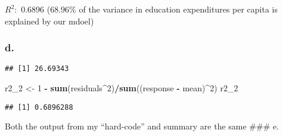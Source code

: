 \documentclass[
]{article}
\newenvironment{Shaded}{\begin{snugshade}}{\end{snugshade}}
\newcommand{\DecValTok}[1]{\textcolor[rgb]{0.00,0.00,0.81}{#1}}
\newcommand{\KeywordTok}[1]{\textcolor[rgb]{0.13,0.29,0.53}{\textbf{#1}}}
\newcommand{\NormalTok}[1]{#1}
\newcommand{\OperatorTok}[1]{\textcolor[rgb]{0.81,0.36,0.00}{\textbf{#1}}}
\newcommand{\StringTok}[1]{\textcolor[rgb]{0.31,0.60,0.02}{#1}}
\begin{document}
\(R^2:\) 0.6896 (68.96\% of the variance in education expenditures per
capita is explained by our mdoel)

\hypertarget{d.}{%
\subsubsection{d.}\label{d.}}

\begin{Shaded}
\end{Shaded}

\begin{verbatim}
## [1] 26.69343
\end{verbatim}

\begin{Shaded}
\begin{Highlighting}[]
\NormalTok{r2_}\DecValTok{2}\NormalTok{ <-}\StringTok{ }\DecValTok{1} \OperatorTok{-}\StringTok{ }\KeywordTok{sum}\NormalTok{(residuals}\OperatorTok{^}\DecValTok{2}\NormalTok{)}\OperatorTok{/}\KeywordTok{sum}\NormalTok{((response }\OperatorTok{-}\StringTok{ }\NormalTok{mean)}\OperatorTok{^}\DecValTok{2}\NormalTok{)}
\NormalTok{r2_}\DecValTok{2}
\end{Highlighting}
\end{Shaded}

\begin{verbatim}
## [1] 0.6896288
\end{verbatim}

Both the output from my ``hard-code'' and summary are the same \#\#\# e.
\end{document}
